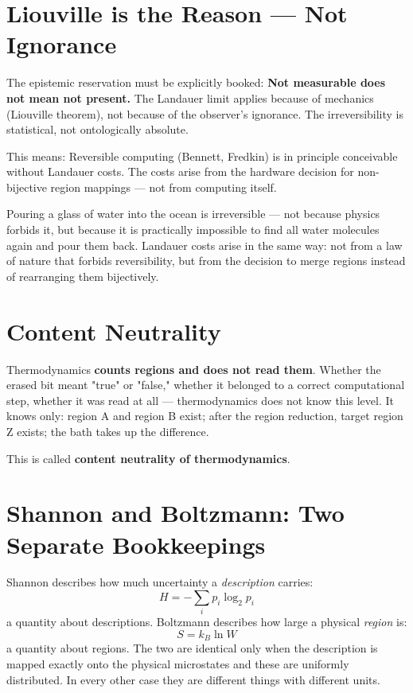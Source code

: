 \section{Liouville is the Reason --- Not Ignorance}

The epistemic reservation must be explicitly booked:
\textbf{Not measurable does not mean not present.} The Landauer limit
applies because of mechanics (Liouville theorem), not because of the observer's
ignorance. The irreversibility is statistical, not ontologically
absolute. 

This means: Reversible computing (Bennett, Fredkin) is in principle conceivable
without Landauer costs. The costs arise from the hardware decision
for non-bijective region mappings --- not from computing itself.

\begin{laierspur}
Pouring a glass of water into the ocean is irreversible --- not because
physics forbids it, but because it is practically impossible to find all
water molecules again and pour them back. Landauer costs
arise in the same way: not from a law of nature that forbids reversibility,
but from the decision to merge regions instead of rearranging them bijectively.
\end{laierspur}

\section{Content Neutrality}

Thermodynamics \textbf{counts regions and does not read them}. 
Whether the erased bit meant "true" or "false," whether it belonged to a
correct computational step, whether it was read at all ---
thermodynamics does not know this level. It knows only: region A and region B
exist; after the region reduction, target region Z exists; the bath takes up
the difference.

This is called \textbf{content neutrality of thermodynamics}.

\section{Shannon and Boltzmann: Two Separate Bookkeepings}

Shannon describes how much uncertainty a \emph{description} carries:
\[
  H = -\sum_i p_i \log_2 p_i
\]
a quantity about descriptions. Boltzmann describes how large a
physical \emph{region} is:
\[
  S = k_B \ln W
\]
a quantity about regions. The two are identical only when the
description is mapped exactly onto the physical microstates
and these are uniformly distributed. In every other case they are different
things with different units. 

